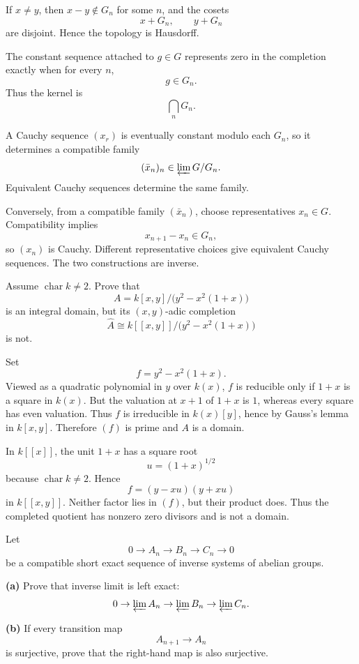 \begin{solution}
If \(x\ne y\), then \(x-y\notin G_n\) for some \(n\), and the cosets
\[
x+G_n,\qquad y+G_n
\]
are disjoint. Hence the topology is Hausdorff.

The constant sequence attached to \(g\in G\) represents zero in the
completion exactly when for every \(n\),
\[
g\in G_n.
\]
Thus the kernel is
\[
\bigcap_nG_n.
\]

A Cauchy sequence \((x_r)\) is eventually constant modulo each \(G_n\), so
it determines a compatible family
\[
(\bar x_n)_n\in\varprojlim G/G_n.
\]
Equivalent Cauchy sequences determine the same family.

Conversely, from a compatible family \((\bar x_n)\), choose representatives
\(x_n\in G\). Compatibility implies
\[
x_{n+1}-x_n\in G_n,
\]
so \((x_n)\) is Cauchy. Different representative choices give equivalent
Cauchy sequences. The two constructions are inverse.
\end{solution}


\begin{problem}[CP-V-0055]
\label{prob:cp-v-0055}
Assume \(\operatorname{char}k\ne2\). Prove that
\[
A=
k[x,y]/\bigl(y^2-x^2(1+x)\bigr)
\]
is an integral domain, but its \((x,y)\)-adic completion
\[
\widehat A
\cong
k[[x,y]]/\bigl(y^2-x^2(1+x)\bigr)
\]
is not.
\end{problem}

\begin{solution}
Set
\[
f=y^2-x^2(1+x).
\]
Viewed as a quadratic polynomial in \(y\) over \(k(x)\), \(f\) is reducible
only if \(1+x\) is a square in \(k(x)\). But the valuation at \(x+1\) of
\(1+x\) is \(1\), whereas every square has even valuation. Thus \(f\) is
irreducible in \(k(x)[y]\), hence by Gauss's lemma in \(k[x,y]\). Therefore
\((f)\) is prime and \(A\) is a domain.

In \(k[[x]]\), the unit \(1+x\) has a square root
\[
u=(1+x)^{1/2}
\]
because \(\operatorname{char}k\ne2\). Hence
\[
f=(y-xu)(y+xu)
\]
in \(k[[x,y]]\). Neither factor lies in \((f)\), but their product does.
Thus the completed quotient has nonzero zero divisors and is not a domain.
\end{solution}


\begin{problem}[CP-V-0087]
\label{prob:cp-v-0087}
Let
\[
0\to A_n\to B_n\to C_n\to0
\]
be a compatible short exact sequence of inverse systems of abelian groups.

\textbf{(a)} Prove that inverse limit is left exact:
\[
0\to\varprojlim A_n
\to\varprojlim B_n
\to\varprojlim C_n.
\]

\textbf{(b)} If every transition map
\[
A_{n+1}\to A_n
\]
is surjective, prove that the right-hand map is also surjective.
\end{problem}

